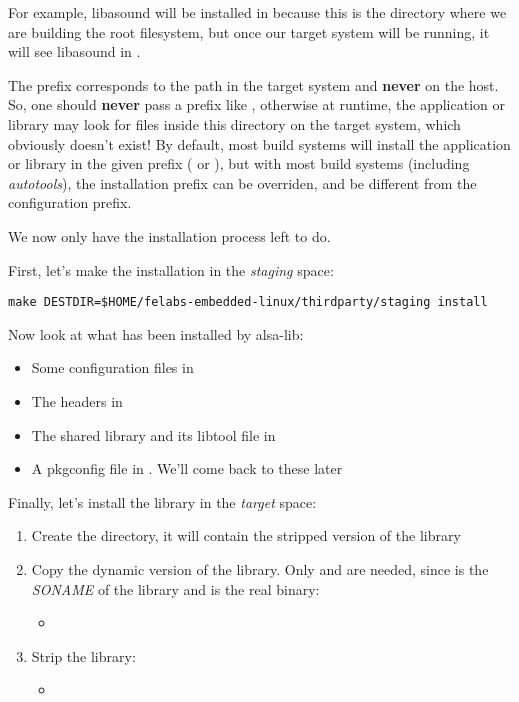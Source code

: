 For example, libasound will be installed in
 because this is
the directory where we are building the root filesystem, but once our
target system will be running, it will see libasound in
.

The prefix corresponds to the path in the target system and {\bf
  never} on the host. So, one should {\bf never} pass a prefix like
, otherwise at
runtime, the application or library may look for files inside this
directory on the target system, which obviously doesn't exist! By
default, most build systems will install the application or library in
the given prefix ( or ), but with most
build systems (including {\em autotools}), the installation prefix can
be overriden, and be different from the configuration prefix.

We now only have the installation process left to do.

First, let's make the installation in the {\em staging} space:
\begin{verbatim}
make DESTDIR=$HOME/felabs-embedded-linux/thirdparty/staging install
\end{verbatim}

Now look at what has been installed by alsa-lib:
\begin{itemize}
\item Some configuration files in 
\item The headers in 
\item The shared library and its libtool file in 
\item A pkgconfig file in . We'll come back
  to these later
\end{itemize}

Finally, let's install the library in the {\em target} space:

\begin{enumerate}
\item Create the  directory, it will contain the
  stripped version of the library
\item Copy the dynamic version of the library. Only
   and  are needed,
  since  is the {\em SONAME} of the library and
   is the real binary:
  \begin{itemize}
  \item {}
  \end{itemize}
\item Strip the library:
  \begin{itemize}
  \item {}
  \end{itemize}
\end{enumerate}


